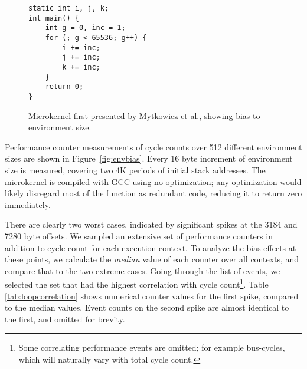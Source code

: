 \documentclass[10pt, conference, compsocconf]{IEEEtran}
\begin{document}
\begin{figure}[t]
  \begin{lstlisting}[frame=single, xleftmargin=.01\textwidth, xrightmargin=.01\textwidth]
static int i, j, k;
int main() {
    int g = 0, inc = 1;
    for (; g < 65536; g++) {
        i += inc;
        j += inc;
        k += inc;
    }
    return 0;
}
  \end{lstlisting}
  \caption{\label{fig:microkernel}Microkernel first presented by Mytkowicz et al.\cite{Mytkowicz:2009:WrongData}, showing bias to environment size.}
\end{figure}

\begin{figure*}[t]
  \caption{Bias from environment size for microkernel. Measured average of 10 cycle count samples for 512 different environments. Spikes show aliasing case, occurring once for each 4K period.}
  \label{fig:envbias}
\end{figure*}

Performance counter measurements of cycle counts over 512 different environment sizes are shown in Figure~\ref{fig:envbias}.
Every 16 byte increment of environment size is measured, covering two 4K periods of initial stack addresses.
The microkernel is compiled with {\small{GCC}} using no optimization; any optimization would likely disregard most of the function as redundant code, reducing it to return zero immediately.

There are clearly two worst cases, indicated by significant spikes at the 3184 and 7280 byte offsets.
We sampled an extensive set of performance counters in addition to cycle count for each execution context.
To analyze the bias effects at these points, we calculate the \emph{median} value of each counter over all contexts, and compare that to the two extreme cases.
Going through the list of events, we selected the set that had the highest correlation with cycle count\footnote{Some correlating performance events are omitted; for example bus-cycles, which will naturally vary with total cycle count.}.
Table \ref{tab:loopcorrelation} shows numerical counter values for the first spike, compared to the median values. Event counts on the second spike are almost identical to the first, and omitted for brevity.
\end{document}
